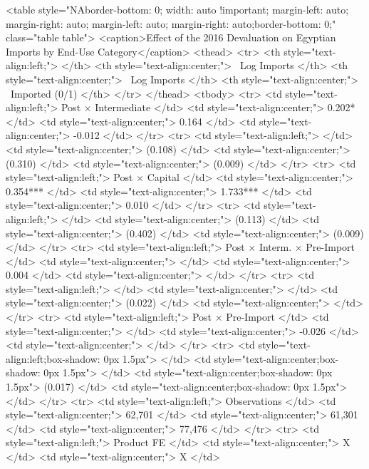 <table style="NAborder-bottom: 0; width: auto !important; margin-left: auto; margin-right: auto; margin-left: auto; margin-right: auto;border-bottom: 0;" class="table table">
<caption>Effect of the 2016 Devaluation on Egyptian Imports by End-Use Category</caption>
 <thead>
  <tr>
   <th style="text-align:left;">   </th>
   <th style="text-align:center;">  Log Imports </th>
   <th style="text-align:center;">  Log Imports  </th>
   <th style="text-align:center;">  Imported (0/1) </th>
  </tr>
 </thead>
<tbody>
  <tr>
   <td style="text-align:left;"> Post $\times$ Intermediate </td>
   <td style="text-align:center;"> 0.202* </td>
   <td style="text-align:center;"> 0.164 </td>
   <td style="text-align:center;"> -0.012 </td>
  </tr>
  <tr>
   <td style="text-align:left;">  </td>
   <td style="text-align:center;"> (0.108) </td>
   <td style="text-align:center;"> (0.310) </td>
   <td style="text-align:center;"> (0.009) </td>
  </tr>
  <tr>
   <td style="text-align:left;"> Post $\times$ Capital </td>
   <td style="text-align:center;"> 0.354*** </td>
   <td style="text-align:center;"> 1.733*** </td>
   <td style="text-align:center;"> 0.010 </td>
  </tr>
  <tr>
   <td style="text-align:left;">  </td>
   <td style="text-align:center;"> (0.113) </td>
   <td style="text-align:center;"> (0.402) </td>
   <td style="text-align:center;"> (0.009) </td>
  </tr>
  <tr>
   <td style="text-align:left;"> Post $\times$ Interm. $\times$ Pre-Import </td>
   <td style="text-align:center;">  </td>
   <td style="text-align:center;"> 0.004 </td>
   <td style="text-align:center;">  </td>
  </tr>
  <tr>
   <td style="text-align:left;">  </td>
   <td style="text-align:center;">  </td>
   <td style="text-align:center;"> (0.022) </td>
   <td style="text-align:center;">  </td>
  </tr>
  <tr>
   <td style="text-align:left;"> Post $\times$ Pre-Import </td>
   <td style="text-align:center;">  </td>
   <td style="text-align:center;"> -0.026 </td>
   <td style="text-align:center;">  </td>
  </tr>
  <tr>
   <td style="text-align:left;box-shadow: 0px 1.5px">  </td>
   <td style="text-align:center;box-shadow: 0px 1.5px">  </td>
   <td style="text-align:center;box-shadow: 0px 1.5px"> (0.017) </td>
   <td style="text-align:center;box-shadow: 0px 1.5px">  </td>
  </tr>
  <tr>
   <td style="text-align:left;"> Observations </td>
   <td style="text-align:center;"> 62,701 </td>
   <td style="text-align:center;"> 61,301 </td>
   <td style="text-align:center;"> 77,476 </td>
  </tr>
  <tr>
   <td style="text-align:left;"> Product FE </td>
   <td style="text-align:center;"> X </td>
   <td style="text-align:center;"> X </td>
